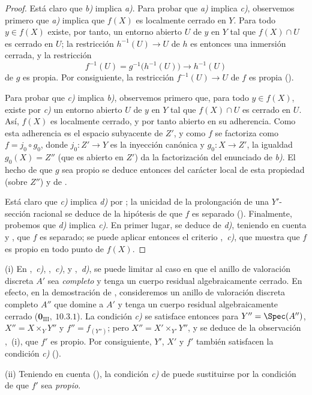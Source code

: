 \begin{proof}
Está claro que \emph{b)} implica \emph{a)}. Para probar que \emph{a)} implica \emph{c)}, observemos primero que \emph{a)} implica que $f(X)$ es localmente cerrado en $Y$. Para todo $y\in f(X)$ existe, por tanto, un entorno abierto $U$
de $y$ en $Y$ tal que $f(X)\cap U$ es cerrado en $U$; la restricción $h^{-1}(U)\to U$ de $h$ es entonces una inmersión cerrada, y la restricción
\[
  f^{-1}(U)=g^{-1}\bigl(h^{-1}(U)\bigr)\longrightarrow h^{-1}(U)
\]
de $g$ es propia. Por consiguiente, la restricción $f^{-1}(U)\to U$ de $f$ es propia ().

Para probar que \emph{c)} implica \emph{b)}, observemos primero que, para todo $y\in f(X)$, existe por \emph{c)} un entorno abierto $U$ de $y$ en $Y$ tal que $f(X)\cap U$ es cerrado en $U$. Así, $f(X)$ es localmente cerrado, y por tanto abierto en su adherencia. Como esta adherencia es el espacio subyacente de $Z'$, y como $f$ se factoriza como $f=j_0\circ g_0$, donde $j_0:Z'\to Y$ es la inyección canónica y $g_0:X\to Z'$, la igualdad $g_0(X)=Z''$ (que es abierto en $Z'$) da la factorización del enunciado de \emph{b)}. El hecho de que $g$ sea propio se deduce entonces del carácter local de esta propiedad (sobre $Z''$) y de .

Está claro que \emph{c)} implica \emph{d)} por ; la unicidad de la prolongación de una $Y'$-sección racional se deduce de la hipótesis de que $f$ es separado ().
Finalmente, probemos que \emph{d)} implica \emph{c)}. En primer lugar, se deduce de \emph{d)}, teniendo en cuenta  y , que $f$ es separado; se puede aplicar entonces el criterio ,~\emph{c)}, que muestra que $f$ es propio en todo punto de $f(X)$.
\end{proof}

\begin{remarks}[15.7.7]
\label{IV.15.7.7}
(i)
En ,~\emph{c)}, ,~\emph{c)}, y ,~\emph{d)}, se puede limitar al caso en que el anillo de valoración discreta $A'$ sea \emph{completo} y tenga un cuerpo residual algebraicamente cerrado.
En efecto, en la demostración de , consideremos un anillo de valoración discreta completo $A''$ que domine a $A'$ y tenga un cuerpo residual algebraicamente cerrado ($\mathbf{0}_{\mathrm{III}},~10.3.1$). La condición \emph{c)} se satisface entonces para $Y''=\Spec(A'')$, $X''=X\times_Y Y''$ y $f''=f_{(Y'')}$; pero $X''=X'\times_{Y'}Y''$, y se deduce de la observación ,~(i), que $f'$ es propio. Por consiguiente, $Y'$, $X'$ y $f'$ también satisfacen la condición \emph{c)} ().

(ii)
Teniendo en cuenta (), la condición \emph{c)} de  puede sustituirse por la condición de que $f'$ sea \emph{propio}.
\end{remarks}

